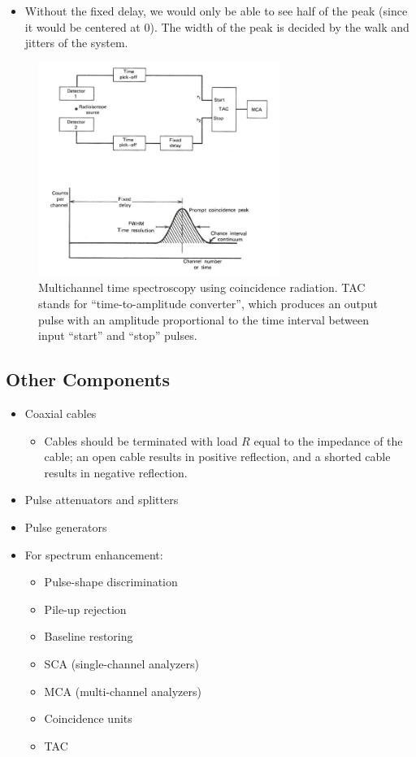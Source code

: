 \begin{itemize}
\begin{itemize}
        \item Without the fixed delay, we would only be able to see half of the peak (since it would be centered at 0). The width of the peak is decided by the walk and jitters of the system. 
    \end{itemize}
    \begin{figure}[ht]
        \centering
        \includegraphics[width=0.7\textwidth]{images/prompt_and_chance_coincidence.png}
        \caption{Multichannel time spectroscopy using coincidence radiation. TAC stands for ``time-to-amplitude converter'', which produces an output pulse with an amplitude proportional to the time interval between input ``start'' and ``stop'' pulses.}
        \label{fig:prompt_and_chance_coincidence}
    \end{figure}
\end{itemize}
\subsection{Other Components}
\begin{itemize}
    \item Coaxial cables
    \begin{itemize}
        \item Cables should be terminated with load $R$ equal to the impedance of the cable; an open cable results in positive reflection, and a shorted cable results in negative reflection.
    \end{itemize}
    \item Pulse attenuators and splitters
    \item Pulse generators
    \item For spectrum enhancement:
    \begin{itemize}
        \item Pulse-shape discrimination
        \item Pile-up rejection
        \item Baseline restoring
        \item SCA (single-channel analyzers)
        \item MCA (multi-channel analyzers)
        \item Coincidence units
        \item TAC
    \end{itemize}
\end{itemize}

